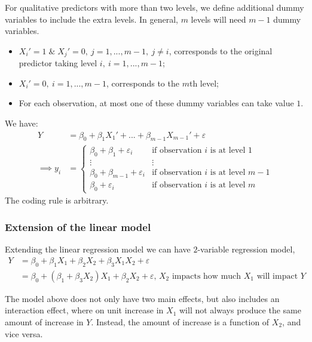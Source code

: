 \documentclass[11pt]{article}
\begin{document}
\noindent For qualitative predictors with more than two levels, we define additional dummy variables to include the extra levels. In general, $m$ levels will need $m-1$ dummy variables.
\begin{itemize}
    \item $X_i' = 1 \; \& \; X_j'=0, \ j=1,...,m-1, \ j \neq i$, corresponds to the original predictor taking level $i, \ i=1,...,m-1$;
    \item $X_i' = 0, \ i=1,...,m-1$, corresponds to the $m$th level;
    \item For each observation, at most one of these dummy variables can take value $1$.
\end{itemize} \phantom{i}

\noindent We have:
\begin{align*}
    Y &= \beta_0 + \beta_1X_1' + ... + \beta_{m-1}X_{m-1}' + \varepsilon \\
    \implies y_i &= \begin{cases}
        \beta_0 + \beta_1 + \varepsilon_i & \text{if observation $i$ is at level $1$} \\
        \vdots & \vdots \\
        \beta_0 + \beta_{m-1} + \varepsilon_i & \text{if observation $i$ is at level $m-1$} \\
        \beta_0 + \varepsilon_i & \text{if observation $i$ is at level $m$}
    \end{cases}
\end{align*}
\noindent The coding rule is arbitrary.

\subsubsection{Extension of the linear model}
\noindent Extending the linear regression model we can have $2$-variable regression model,
\begin{align*}
    Y &= \beta_0 + \beta_1X_1 + \beta_2X_2 + \beta_3X_1X_2 + \varepsilon \\
    &= \beta_0 + (\beta_1 + \beta_3X_2)X_1 + \beta_2X_2 + \varepsilon \text{, $X_2$ impacts how much $X_1$ will impact $Y$}
\end{align*} \phantom{i}

\noindent The model above does not only have two main effects, but also includes an interaction effect, where on unit increase in $X_1$ will not always produce the same amount of increase in $Y$. Instead, the amount of increase is a function of $X_2$, and vice versa. \\
\end{document}
